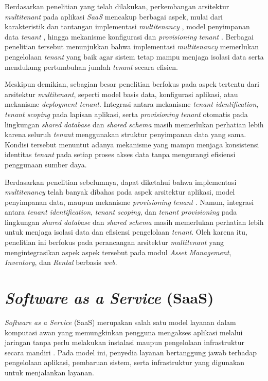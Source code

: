 Berdasarkan penelitian yang telah dilakukan, perkembangan arsitektur \textit{multitenant} pada aplikasi \textit{SaaS} mencakup berbagai aspek, mulai dari karakteristik dan tantangan implementasi \textit{multitenancy} \cite{ref3,ref4}, model penyimpanan data \textit{tenant} \cite{ref6,ref9}, hingga mekanisme konfigurasi dan \textit{provisioning} \textit{tenant} \cite{ref8}. Berbagai penelitian tersebut menunjukkan bahwa implementasi \textit{multitenancy} memerlukan pengelolaan \textit{tenant} yang baik agar sistem tetap mampu menjaga isolasi data serta mendukung pertumbuhan jumlah \textit{tenant} secara efisien.

Meskipun demikian, sebagian besar penelitian berfokus pada aspek tertentu dari arsitektur \textit{multitenant}, seperti model basis data, konfigurasi aplikasi, atau mekanisme \textit{deployment} \textit{tenant}. Integrasi antara mekanisme \textit{tenant identification}, \textit{tenant scoping} pada lapisan aplikasi, serta \textit{provisioning} \textit{tenant} otomatis pada lingkungan \textit{shared database} dan \textit{shared schema} masih memerlukan perhatian lebih karena seluruh \textit{tenant} menggunakan struktur penyimpanan data yang sama. Kondisi tersebut menuntut adanya mekanisme yang mampu menjaga konsistensi identitas \textit{tenant} pada setiap proses akses data tanpa mengurangi efisiensi penggunaan sumber daya.

Berdasarkan penelitian sebelumnya, dapat diketahui bahwa implementasi \textit{multitenancy} telah banyak dibahas pada aspek arsitektur aplikasi, model penyimpanan data, maupun mekanisme \textit{provisioning} \textit{tenant} \cite{ref3,ref4,ref6,ref8,ref9}. Namun, integrasi antara \textit{tenant identification}, \textit{tenant scoping}, dan \textit{tenant provisioning} pada lingkungan \textit{shared database} dan \textit{shared schema} masih memerlukan perhatian lebih untuk menjaga isolasi data dan efisiensi pengelolaan \textit{tenant}. Oleh karena itu, penelitian ini berfokus pada perancangan arsitektur \textit{multitenant} yang mengintegrasikan aspek aspek tersebut pada modul \textit{Asset Management}, \textit{Inventory}, dan \textit{Rental} berbasis \textit{web}.

\section{\textit{Software as a Service} (SaaS)}

\textit{Software as a Service} (SaaS) merupakan salah satu model layanan dalam komputasi awan yang memungkinkan pengguna mengakses aplikasi melalui jaringan tanpa perlu melakukan instalasi maupun pengelolaan infrastruktur secara mandiri \cite{ref5} \cite{ref10}. Pada model ini, penyedia layanan bertanggung jawab terhadap pengelolaan aplikasi, pembaruan sistem, serta infrastruktur yang digunakan untuk menjalankan layanan.

